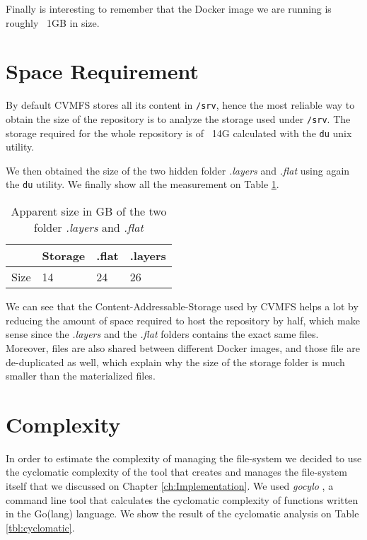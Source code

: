 Finally is interesting to remember that the Docker image we are running is
roughly ~1GB in size.

\section{Space Requirement}

By default CVMFS stores all its content in \texttt{/srv}, hence the most
reliable way to obtain the size of the repository is to analyze the storage
used under \texttt{/srv}. The storage required for the whole repository is of
~14G calculated with the \texttt{du} unix utility.

We then obtained the size of the two hidden folder \textit{.layers} and
\textit{.flat} using again the \texttt{du} utility. We finally show all the
measurement on Table \ref{tab:size-of-repo}.

\begin{table}[h]
\begin{center}
\begin{tabular}{|l|lll|}
\hline
        & Storage & .flat & .layers \\ \hline
        Size & 14 & 24    & 26      \\ \hline
\end{tabular}
\end{center}
\caption{Apparent size in GB of the two folder \textit{.layers} and \textit{.flat}}
\label{tab:size-of-repo}
\end{table}

We can see that the Content-Addressable-Storage used by CVMFS helps a lot by
reducing the amount of space required to host the repository by half, which
make sense since the \textit{.layers} and the \textit{.flat} folders contains
the exact same files. Moreover, files are also shared between different Docker
images, and those file are de-duplicated as well, which explain why the size of
the storage folder is much smaller than the materialized files.

\section{Complexity}

In order to estimate the complexity of managing the file-system we decided to
use the cyclomatic complexity of the tool that creates and manages the
file-system itself that we discussed on Chapter \ref{ch:Implementation}. We used
\textit{gocylo} \cite{gocyclo}, a command line tool that calculates the
cyclomatic complexity of functions written in the Go(lang) language. We show
the result of the cyclomatic analysis on Table \ref{tbl:cyclomatic}.

